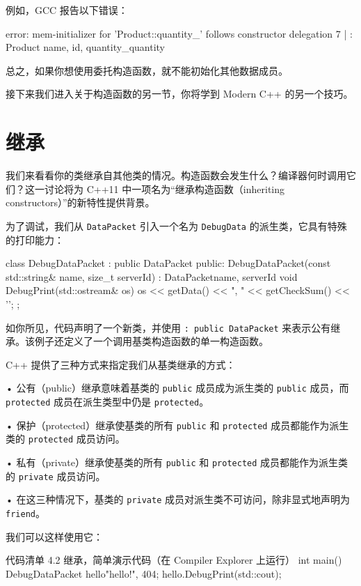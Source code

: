 例如，GCC 报告以下错误：


\begin{codebox}[cpp]
error: mem-initializer for 'Product::quantity_' follows constructor delegation
7 |
: Product {name, id}, quantity_{quantity}
\end{codebox}

总之，如果你想使用委托构造函数，就不能初始化其他数据成员。

接下来我们进入关于构造函数的另一节，你将学到 Modern C++ 的另一个技巧。

\section{继承}

我们来看看你的类继承自其他类的情况。构造函数会发生什么？编译器何时调用它们？这一讨论将为 C++11 中一项名为“继承构造函数（inheriting constructors）”的新特性提供背景。

为了调试，我们从 \texttt{DataPacket} 引入一个名为 \texttt{DebugData} 的派生类，它具有特殊的打印能力：

\begin{codebox}[cpp]
class DebugDataPacket : public DataPacket {
public:
DebugDataPacket(const std::string& name, size_t serverId)
: DataPacket{name, serverId} {
}
void DebugPrint(std::ostream& os) {
os << getData() << ", " << getCheckSum() << '\n';
}
};
\end{codebox}

如你所见，代码声明了一个新类，并使用 \texttt{: public DataPacket} 来表示公有继承。该例子还定义了一个调用基类构造函数的单一构造函数。

C++ 提供了三种方式来指定我们从基类继承的方式：

• 公有（public）继承意味着基类的 \texttt{public} 成员成为派生类的 \texttt{public} 成员，而 \texttt{protected} 成员在派生类型中仍是 \texttt{protected}。

• 保护（protected）继承使基类的所有 \texttt{public} 和 \texttt{protected} 成员都能作为派生类的 \texttt{protected} 成员访问。

• 私有（private）继承使基类的所有 \texttt{public} 和 \texttt{protected} 成员都能作为派生类的 \texttt{private} 成员访问。

• 在这三种情况下，基类的 \texttt{private} 成员对派生类不可访问，除非显式地声明为 \texttt{friend}。

我们可以这样使用它：

\begin{codeboxt}[cpp]{代码清单 4.2 继承，简单演示代码（在 Compiler Explorer 上运行）}
int main() {
DebugDataPacket hello{"hello!", 404};
hello.DebugPrint(std::cout);
}
\end{codeboxt}

